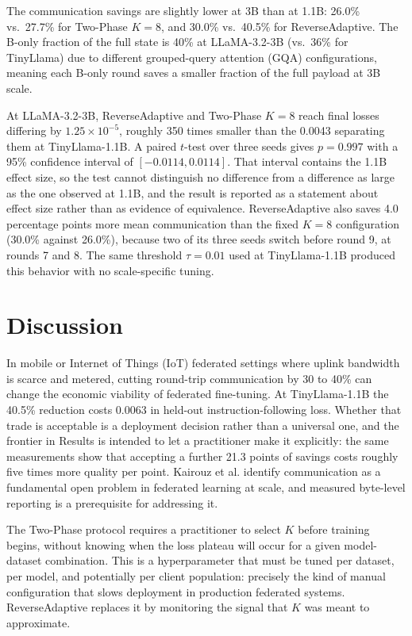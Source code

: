 \documentclass[pdflatex,sn-nature,lineno]{sn-jnl}
\begin{document}
The communication savings are slightly lower at 3B than at 1.1B: 26.0\% vs.\ 27.7\% for Two-Phase $K{=}8$, and 30.0\% vs.\ 40.5\% for ReverseAdaptive. The B-only fraction of the full state is 40\% at LLaMA-3.2-3B (vs.\ 36\% for TinyLlama) due to different grouped-query attention (GQA) configurations, meaning each B-only round saves a smaller fraction of the full payload at 3B scale.

At LLaMA-3.2-3B, ReverseAdaptive and Two-Phase $K{=}8$ reach final losses differing by $1.25 \times 10^{-5}$, roughly 350 times smaller than the 0.0043 separating them at TinyLlama-1.1B. A paired $t$-test over three seeds gives $p = 0.997$ with a 95\% confidence interval of $[{-}0.0114, 0.0114]$. That interval contains the 1.1B effect size, so the test cannot distinguish no difference from a difference as large as the one observed at 1.1B, and the result is reported as a statement about effect size rather than as evidence of equivalence. ReverseAdaptive also saves 4.0 percentage points more mean communication than the fixed $K{=}8$ configuration (30.0\% against 26.0\%), because two of its three seeds switch before round 9, at rounds 7 and 8. The same threshold $\tau{=}0.01$ used at TinyLlama-1.1B produced this behavior with no scale-specific tuning.

\section{Discussion}
\label{sec:discussion}

In mobile or Internet of Things (IoT) federated settings where uplink bandwidth is scarce and metered, cutting round-trip communication by 30 to 40\% can change the economic viability of federated fine-tuning. At TinyLlama-1.1B the 40.5\% reduction costs 0.0063 in held-out instruction-following loss. Whether that trade is acceptable is a deployment decision rather than a universal one, and the frontier in Results is intended to let a practitioner make it explicitly: the same measurements show that accepting a further 21.3 points of savings costs roughly five times more quality per point. Kairouz et al. \cite{kairouz2021advances} identify communication as a fundamental open problem in federated learning at scale, and measured byte-level reporting is a prerequisite for addressing it.

\label{sec:choosing}
The Two-Phase protocol requires a practitioner to select $K$ before training begins, without knowing when the loss plateau will occur for a given model-dataset combination. This is a hyperparameter that must be tuned per dataset, per model, and potentially per client population: precisely the kind of manual configuration that slows deployment in production federated systems. ReverseAdaptive replaces it by monitoring the signal that $K$ was meant to approximate.
\end{document}
